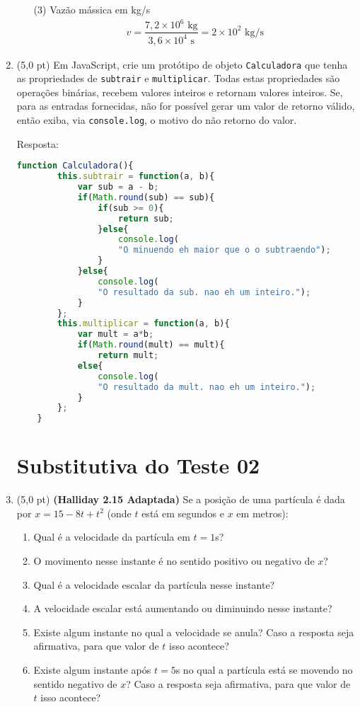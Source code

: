 \documentclass[12pt,a4paper,oneside]{article}
\begin{document}
\begin{enumerate}
\begin{enumerate}
{		(3) Vazão mássica em kg/s
		\begin{eqnarray*}
			v  =  \dfrac{7,2 \times 10^6  \mbox{ kg}}{3,6 \times 10^4 \mbox{ s}}	= 2 \times 10^2 \mbox{ kg/s}
		\end{eqnarray*}
	}
\end{enumerate}		 
	
	
	\item (5,0 pt) Em JavaScript, crie um protótipo de objeto {\tt Calculadora} que tenha as propriedades de {\tt subtrair} e {\tt multiplicar}. Todas estas propriedades são operações binárias, recebem valores inteiros e retornam valores inteiros. Se, para as entradas fornecidas, não for possível gerar um valor de retorno válido, então exiba, via {\tt console.log}, o motivo do não retorno do valor.
	
		{\color{blue} Resposta: }
	
	\begin{lstlisting}[language=JavaScript]
	function Calculadora(){
		this.subtrair = function(a, b){
			var sub = a - b;
			if(Math.round(sub) == sub){
				if(sub >= 0){
					return sub;
				}else{
					console.log(
					"O minuendo eh maior que o o subtraendo");
				}
			}else{
				console.log(
				"O resultado da sub. nao eh um inteiro.");
			}
		};
		this.multiplicar = function(a, b){
			var mult = a*b;
			if(Math.round(mult) == mult){
				return mult;
			else{
				console.log(
				"O resultado da mult. nao eh um inteiro.");
			}
		};
	}\end{lstlisting}
	
	\newpage
	
	\section*{Substitutiva do Teste 02}
	
	\item (5,0 pt) {\bf (Halliday 2.15 Adaptada)} Se a posição de uma partícula é dada por $x = 15 -8t  + t^2$ (onde $t$ está em segundos e $x$ em metros): \label{questao}
	\begin{enumerate}
		\item Qual é a velocidade da partícula em $t = 1$s? 
		\item O movimento nesse instante é no sentido positivo ou negativo de $x$? 
		\item Qual é a velocidade escalar da partícula nesse instante?
		\item A velocidade escalar está aumentando	ou diminuindo nesse instante?
		\item Existe algum instante no 	qual a velocidade se anula? Caso a resposta seja afirmativa, para que valor de $t$ isso acontece? 
		\item Existe algum instante após  $t  = 5$s	no qual a partícula está se movendo no sentido negativo de $x$?  Caso a resposta seja afirmativa, para que valor de $t$ isso acontece?
	\end{enumerate}


\end{enumerate}
\end{document}
